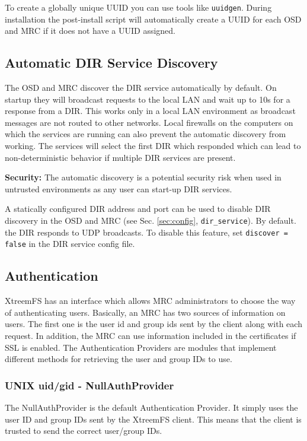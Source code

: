 \documentclass[a4paper,10pt]{book}
\begin{document}
To create a globally unique UUID you can use tools like \texttt{uuidgen}. During installation the post-install script will automatically create a UUID for each OSD and MRC if it does not have a UUID assigned.

\subsection{Automatic DIR Service Discovery}
\label{sec:autodiscover}
The OSD and MRC discover the DIR service automatically by default. On startup they will broadcast requests to the local LAN and wait up to 10s for a response from a DIR. This works only in a local LAN environment as broadcast messages are not routed to other networks. Local firewalls on the computers on which the services are running can also prevent the automatic discovery from working. The services will select the first DIR which responded which can lead to non-deterministic behavior if multiple DIR services are present.

\textbf{Security:} The automatic discovery is a potential security risk when used in untrusted environments as any user can start-up DIR services.

A statically configured DIR address and port can be used to disable DIR discovery in the OSD and MRC (see Sec. \ref{sec:config}, \texttt{dir\_service}). By default. the DIR responds to UDP broadcasts. To disable this feature, set  \texttt{discover = false} in the DIR service config file.

\subsection{Authentication}
\label{sec:AuthProvider}
XtreemFS has an interface which allows MRC administrators to choose the way of authenticating users. Basically, an MRC has two sources of information on users. The first one is the user id and group ids sent by the client along with each request. In addition, the MRC can use information included in the certificates if SSL is enabled. The Authentication Providers are modules that implement different methods for retrieving the user and group IDs to use.

\subsubsection{UNIX uid/gid - NullAuthProvider}

The NullAuthProvider is the default Authentication Provider. It simply uses the user ID and group IDs sent by the XtreemFS client. This means that the client is trusted to send the correct user/group IDs.
\end{document}
